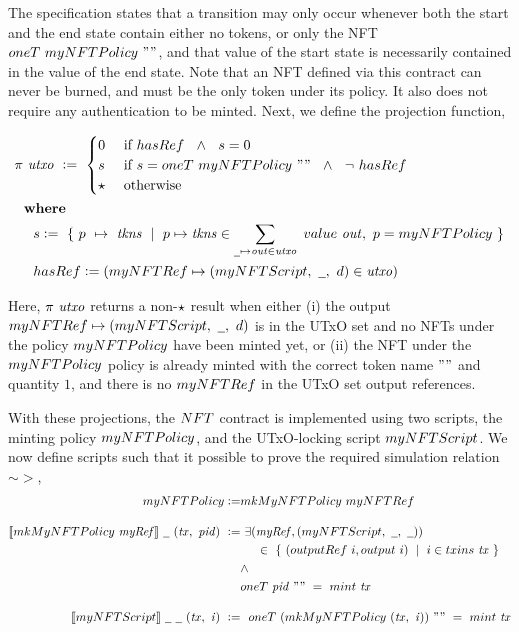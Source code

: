 The specification states that a transition may only occur whenever both the
start and the end state contain either no tokens, or only the NFT
$\fun{oneT}~\fun{myNFTPolicy}~""$, and that value of the start state is necessarily
contained in the value of the end state. Note that an NFT defined via this
contract can never be burned, and must be the only token under its policy. It also
does not require any authentication to be minted.
Next, we define the projection function,

\begin{align*}
  & \pi~\var{utxo}~ \leteq~\begin{cases}
    0 & \text{ if } \fun{hasRef}~~\wedge~~s = 0 \\
    s & \text{ if } s = \fun{oneT}~\fun{myNFTPolicy}~"" ~~\wedge~~ \neg~\fun{hasRef}\\
    \emptytype & \text{ otherwise } \\
  \end{cases} \\
  &  \where \\
  &  ~~~~s \leteq~ \{~p~\mapsto~ \var{tkns}~\mid~p\mapsto \var{tkns} \in \sum_{\wcard \mapsto \var{out}\in \var{utxo}}~\val~\var{out},~p = \fun{myNFTPolicy}~\} \\
  &  ~~~~\fun{hasRef} \leteq (\fun{myNFTRef} \mapsto (\fun{myNFTScript},~\wcard,~d) \in \var{utxo})
\end{align*}

Here, $\pi~\mathit{utxo}$ returns a non-$\star$ result when either (i) the output
$\fun{myNFTRef} \mapsto (\fun{myNFTScript},~\wcard,~d)$ is in the UTxO set and no
NFTs under the policy $\fun{myNFTPolicy}$ have been minted yet, or (ii) the NFT under
the $\fun{myNFTPolicy}$ policy is already minted with the correct token name $""$
and quantity $1$, and there is no $\fun{myNFTRef}$ in the UTxO set output references.

With these projections, the $\fun{NFT}$ contract is implemented using two scripts,
the minting policy $\fun{myNFTPolicy}$, and the UTxO-locking script
$\fun{myNFTScript}$. We now define
scripts such that it possible to prove the required simulation
relation $\sim >$,
\begin{align*}
  \fun{myNFTPolicy} \leteq & \fun{mkMyNFTPolicy}~ \fun{myNFTRef}
  \nextdef
  \applyMPScript{\fun{mkMyNFTPolicy}~ \var{myRef}}~\wcard~(\var{tx},~\var{pid})~\leteq &~
  \exists (\var{myRef}, (\fun{myNFTScript},~\wcard, ~\wcard))~\\
  &~~~~\in~ \{ ~(\outputref~i, \fun{output}~i)~\mid~i \in \inputs~\var{tx}~\} \\
  & \wedge \\
  & \fun{oneT}~\var{pid}~"" ~=~ \mint~\var{tx}
  \nextdef
  \applyScript{\fun{myNFTScript}}~\wcard~\wcard~(\var{tx},~\var{i})~\leteq &~
  ~\fun{oneT}~(\fun{mkMyNFTPolicy}~ (\var{tx},~\var{i}))~"" ~=~ \mint~\var{tx}
\end{align*}

